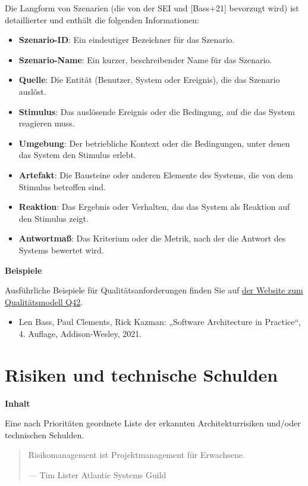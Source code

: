\documentclass[
]{article}
\begin{document}
Die Langform von Szenarien (die von der SEI und {[}Bass+21{]} bevorzugt
wird) ist detaillierter und enthält die folgenden Informationen:

\begin{itemize}
\item
  \textbf{Szenario-ID}: Ein eindeutiger Bezeichner für das Szenario.
\item
  \textbf{Szenario-Name}: Ein kurzer, beschreibender Name für das
  Szenario.
\item
  \textbf{Quelle}: Die Entität (Benutzer, System oder Ereignis), die das
  Szenario auslöst.
\item
  \textbf{Stimulus}: Das auslösende Ereignis oder die Bedingung, auf die
  das System reagieren muss.
\item
  \textbf{Umgebung}: Der betriebliche Kontext oder die Bedingungen,
  unter denen das System den Stimulus erlebt.
\item
  \textbf{Artefakt}: Die Bausteine oder anderen Elemente des Systems,
  die von dem Stimulus betroffen sind.
\item
  \textbf{Reaktion}: Das Ergebnis oder Verhalten, das das System als
  Reaktion auf den Stimulus zeigt.
\item
  \textbf{Antwortmaß}: Das Kriterium oder die Metrik, nach der die
  Antwort des Systems bewertet wird.
\end{itemize}

\textbf{Beispiele}

Ausführliche Beispiele für Qualitätsanforderungen finden Sie auf
\href{https://quality.arc42.org}{der Website zum Qualitätsmodell Q42}.

\begin{itemize}
\item
  Len Bass, Paul Clements, Rick Kazman: „Software Architecture in
  Practice``, 4. Auflage, Addison-Wesley, 2021.
\end{itemize}

\section{Risiken und technische Schulden}\label{section-technical-risks}

\textbf{Inhalt}

Eine nach Prioritäten geordnete Liste der erkannten Architekturrisiken
und/oder technischen Schulden.

\begin{quote}
Risikomanagement ist Projektmanagement für Erwachsene.

---  Tim Lister Atlantic Systems Guild
\end{quote}
\end{document}
